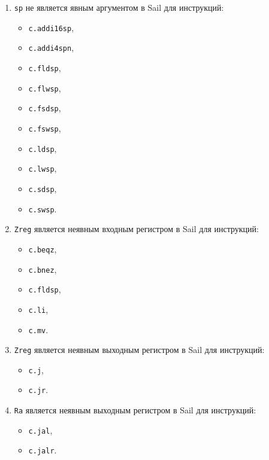 \begin{enumerate}
      \item \texttt{sp} не является явным аргументом в Sail для инструкций:
      \begin{itemize}
            \item \texttt{c.addi16sp},
            \item \texttt{c.addi4spn},
            \item \texttt{c.fldsp},
            \item \texttt{c.flwsp},
            \item \texttt{c.fsdsp},
            \item \texttt{c.fswsp},
            \item \texttt{c.ldsp},
            \item \texttt{c.lwsp},
            \item \texttt{c.sdsp},
            \item \texttt{c.swsp}.
      \end{itemize}
      \item \texttt{Zreg} является неявным входным регистром в Sail для инструкций:
      \begin{itemize}
            \item \texttt{c.beqz},
            \item \texttt{c.bnez},
            \item \texttt{c.fldsp},
            \item \texttt{c.li},
            \item \texttt{c.mv}.
      \end{itemize}
      \item \texttt{Zreg} является неявным выходным регистром в Sail для инструкций:
      \begin{itemize}
            \item \texttt{c.j},
            \item \texttt{c.jr}.
      \end{itemize}
      \item \texttt{Ra} является неявным выходным регистром в Sail для инструкций:
      \begin{itemize}
            \item \texttt{c.jal},
            \item \texttt{c.jalr}.
      \end{itemize}
\end{enumerate}


